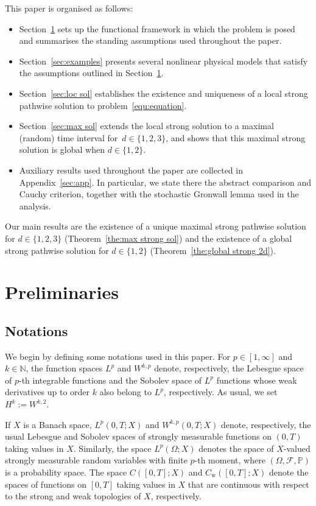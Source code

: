 \documentclass[11pt, reqno]{amsart}
\theoremstyle{definition}
\numberwithin{equation}{section}
\newcommand{\bb}{\mathbb}
\begin{document}
This paper is organised as follows:
\begin{itemize}
    \item Section~\ref{sec:prelim} sets up the functional framework in which the problem is posed and summarises the standing assumptions used throughout the paper.
    \item Section~\ref{sec:examples} presents several nonlinear physical models that satisfy the assumptions outlined in Section~\ref{sec:prelim}.
    \item Section~\ref{sec:loc sol} establishes the existence and uniqueness of a local strong pathwise solution to problem~\eqref{equ:equation}.
    \item Section~\ref{sec:max sol} extends the local strong solution to a maximal (random) time interval for~$d\in\{1,2,3\}$, and shows that this maximal strong solution is global when $d\in \{1,2\}$.
    \item Auxiliary results used throughout the paper are collected in
    Appendix~\ref{sec:app}. In particular, we state there the abstract comparison
    and Cauchy criterion, together with the stochastic Gronwall lemma used in the
    analysis.
\end{itemize}
Our main results are the existence of a unique maximal strong pathwise solution for $d\in\{1,2,3\}$ (Theorem~\ref{the:max strong sol}) and the existence of a global strong pathwise solution for $d\in\{1,2\}$ (Theorem~\ref{the:global strong 2d}).


\section{Preliminaries}\label{sec:prelim}

\subsection{Notations}\label{sec:notation}

We begin by defining some notations used in this paper. For $p\in [1,\infty]$ and $k\in \bb{N}$, the function spaces $L^p$ and $W^{k,p}$ denote, respectively, the Lebesgue space of $p$-th integrable functions and the Sobolev space of $L^p$ functions whose weak derivatives up to order $k$ also belong to $L^p$, respectively. As usual, we set $H^k := W^{k,2}$.


{If $X$ is a Banach space, $L^p(0,T; X)$ and $W^{k,p}(0,T;X)$ denote, respectively, the usual Lebesgue and Sobolev spaces of strongly measurable functions on $(0,T)$ taking values in $X$. Similarly, the space $L^p(\Omega; X)$ denotes the space of $X$-valued strongly measurable random variables with finite $p$-th moment, where $(\Omega,\mathcal{F},\bb{P})$ is a probability space. The space $C([0,T];X)$ and $C_\mathrm{w}([0,T]; X)$ denote the spaces of functions on $[0,T]$ taking values in $X$ that are continuous with respect to the strong and weak topologies of $X$, respectively.}
\end{document}
